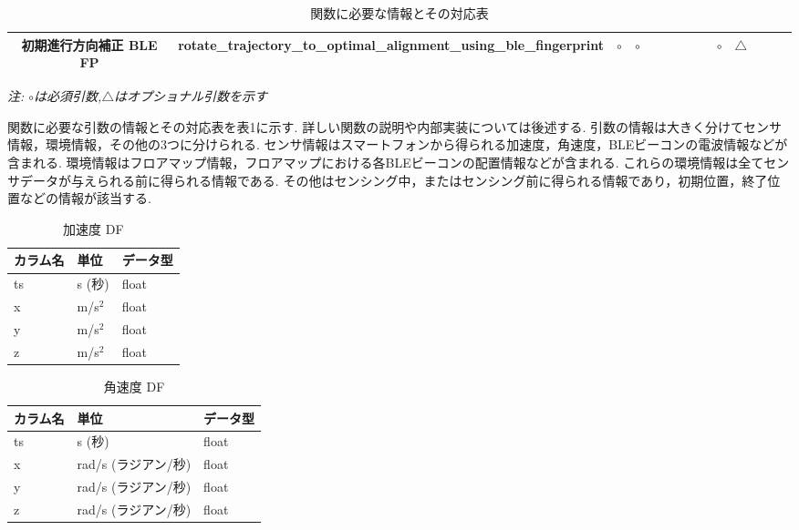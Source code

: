 \begin{table}[ht]
{\begin{tabular}{|c|c|c|c|c|c|c|c|c|c|c|c|c|c|}
			初期進行方向補正 BLE FP & rotate\_trajectory\_to\_optimal\_alignment\_using\_ble\_fingerprint
			                & \multicolumn{1}{c|}{$\circ$}                                        & \multicolumn{1}{c|}{$\circ$} &                              &                              &                              &                              &                                                                                                               & \multicolumn{1}{c|}{$\circ$} &  \multicolumn{1}{c|}{$\triangle$}                                                          &  &    &                                   \\ \hline
		\end{tabular}
	}
	\caption{関数に必要な情報とその対応表} \label{}
	\textit{注: $\circ$は必須引数,$\triangle$はオプショナル引数を示す} \label{tab:my_label}
\end{table}


関数に必要な引数の情報とその対応表を表1に示す.
詳しい関数の説明や内部実装については後述する.
引数の情報は大きく分けてセンサ情報，環境情報，その他の3つに分けられる.
センサ情報はスマートフォンから得られる加速度，角速度，BLEビーコンの電波情報などが含まれる.
環境情報はフロアマップ情報，フロアマップにおける各BLEビーコンの配置情報などが含まれる.
これらの環境情報は全てセンサデータが与えられる前に得られる情報である.
その他はセンシング中，またはセンシング前に得られる情報であり，初期位置，終了位置などの情報が該当する.


\begin{table}[ht]
	\centering
	\begin{tabular}{lll}
		\toprule
		カラム名 & 単位        & データ型  \\
		\midrule
		ts   & s (秒)     & float \\
		x    & m/s\(^2\) & float \\
		y    & m/s\(^2\) & float \\
		z    & m/s\(^2\) & float \\
		\bottomrule
	\end{tabular}
	\caption{加速度 DF}
\end{table}

\begin{table}[ht]
	\centering
	\begin{tabular}{lll}
		\toprule
		カラム名 & 単位             & データ型  \\
		\midrule
		ts   & s (秒)          & float \\
		x    & rad/s (ラジアン/秒) & float \\
		y    & rad/s (ラジアン/秒) & float \\
		z    & rad/s (ラジアン/秒) & float \\
		\bottomrule
	\end{tabular}
	\caption{角速度 DF}
\end{table}


